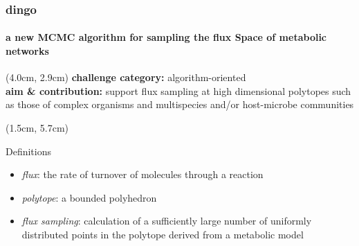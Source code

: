 \documentclass{beamer}
\begin{document}


   \begin{darkframes}
      \begin{frame}
         \frametitle{\textbf{dingo} }
         \framesubtitle{a new MCMC algorithm for sampling the flux Space of metabolic networks }


         \small


         \begin{textblock*}{7cm}(4.0cm, 2.9cm)
            \small
            \textbf{challenge category: } algorithm-oriented \\
            \bigskip
            \textbf{aim \& contribution: } support flux sampling at high dimensional polytopes 
            such as those of complex organisms and multispecies and/or host-microbe communities 
         \end{textblock*}

         \begin{textblock*}{10cm}(1.5cm, 5.7cm)
            \begin{block}{Definitions}
               \footnotesize
               \begin{itemize}
                  \item \textit{flux}: the rate of turnover of molecules through a reaction
                  \item \textit{polytope}: a bounded polyhedron
                  \item \textit{flux sampling}: calculation of a sufficiently large number of uniformly distributed points in the polytope derived from a metabolic model
               \end{itemize}
            \end{block}
               

\end{textblock*}
\end{frame}
\end{darkframes}
\end{document}
